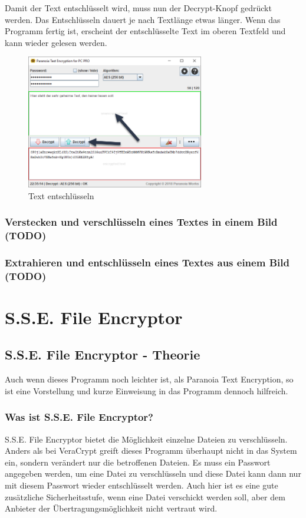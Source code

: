 \documentclass[12pt,a4paper]{scrreprt}
\begin{document}
\noindent Damit der Text entschlüsselt wird, muss nun der Decrypt-Knopf gedrückt werden. Das Entschlüsseln dauert je nach Textlänge etwas länger. Wenn das Programm fertig ist, erscheint der entschlüsselte Text im oberen Textfeld und kann wieder gelesen werden.

\begin{figure}[h]
\begin{center}
\includegraphics[width=220pt]{media/pte5.png}
\caption{Text entschlüsseln}
\label{pte6}
\end{center}
\end{figure}

\section{Verstecken und verschlüsseln eines Textes in einem Bild (TODO)}

\section{Extrahieren und entschlüsseln eines Textes aus einem Bild (TODO)}


\part{S.S.E. File Encryptor}

\chapter{S.S.E. File Encryptor - Theorie}
Auch wenn dieses Programm noch leichter ist, als Paranoia Text Encryption, so ist eine Vorstellung und kurze Einweisung in das Programm dennoch hilfreich.

\section{Was ist S.S.E. File Encryptor?}
S.S.E. File Encryptor bietet die Möglichkeit einzelne Dateien zu verschlüsseln. Anders als bei VeraCrypt greift dieses Programm überhaupt nicht in das System ein, sondern verändert nur die betroffenen Dateien. Es muss ein Passwort angegeben werden, um eine Datei zu verschlüsseln und diese Datei kann dann nur mit diesem Passwort wieder entschlüsselt werden. Auch hier ist es eine gute zusätzliche Sicherheitsstufe, wenn eine Datei verschickt werden soll, aber dem Anbieter der Übertragungsmöglichkeit nicht vertraut wird.
\end{document}

